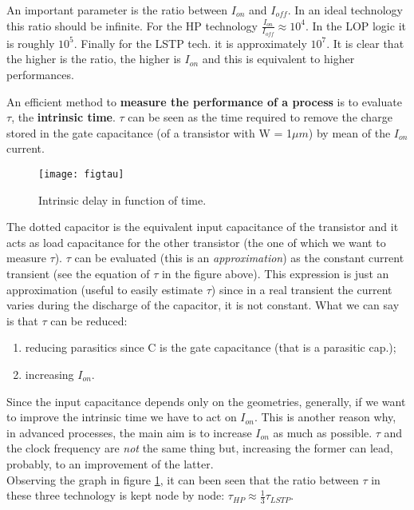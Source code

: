 \documentclass[a4paper, 12pt, twoside, openright]{report}
\begin{document}
An important parameter is the ratio between $I_{on}$ and $I_{off}$. In an ideal technology this ratio should be infinite. For the HP technology $\frac{I_{on}}{I_{off}} \approx 10^4$. In the LOP logic it is roughly $10^5$. Finally for the LSTP tech. it is approximately $10^7$. It is clear that the higher is the ratio, the higher is $I_{on}$ and this is equivalent to higher performances.

An efficient method to \textbf{measure the performance of a process} is to evaluate $\tau$, the \textbf{intrinsic time}. $\tau$ can be seen as the time required to remove the charge stored in the gate capacitance (of a transistor with W = 1$\mu m$) by mean of the $I_{on}$ current.

	\begin{figure}[h]
	\centering
	\texttt{[image: figtau]}
	\caption{Intrinsic delay in function of time.}
	\label{tau}
	\end{figure}

The dotted capacitor is the equivalent input capacitance of the transistor and it acts as load capacitance for the other transistor (the one of which we want to measure $\tau$). $\tau$ can be evaluated (this is an \emph{approximation}) as the constant current transient (see the equation of $\tau$ in the figure above). This expression is just an approximation (useful to easily estimate $\tau$) since in a real transient the current varies during the discharge of the capacitor, it is not constant. What we can say is that $\tau$ can be reduced:

	\begin{enumerate}
		\item reducing parasitics since C is the gate capacitance (that is a parasitic cap.);
		\item increasing $I_{on}$.
	\end{enumerate}

Since the input capacitance depends only on the geometries, generally, if we want to improve the intrinsic time we have to act on $I_{on}$. This is another reason why, in advanced processes, the main aim is to increase $I_{on}$ as much as possible. $\tau$ and the clock frequency are \emph{not} the same thing but, increasing the former can lead, probably, to an improvement of the latter.\\
Observing the graph in figure \ref{tau}, it can been seen that the ratio between $\tau$ in these three technology is kept node by node: $\tau_{HP} \approx \frac{1}{3} \tau_{LSTP}$.
\end{document}
